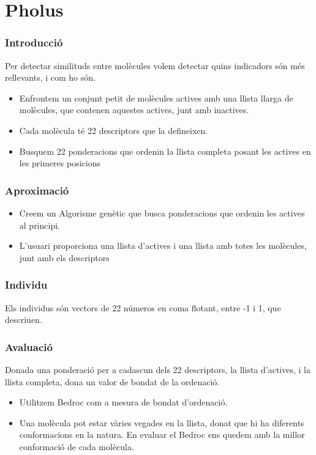 \documentclass{beamer}
\begin{document}
\section{Pholus} %
\label{sec:Pholus}

\begin{frame}
	\frametitle{Introducció}
	Per detectar similituds entre molècules volem detectar quins indicadors són
	més rellevants, i com ho són. 
	\pause
	\begin{itemize}
		\item Enfrontem un conjunt petit de molècules actives amb una llista llarga de molècules,
			que contenen aquestes actives, junt amb inactives.
		\item Cada molècula té 22 descriptors que la defineixen.
		\item Busquem 22 ponderacions que ordenin la llista completa posant les actives en les
			primeres posicions
	\end{itemize}
\end{frame}

\begin{frame}
\frametitle{Aproximació}
	\begin{itemize}
		\item Creem un Algorisme genètic que busca ponderacions que ordenin les actives al principi.
		\item L'usuari proporciona una llista d'actives i una llista amb totes les molècules, junt
			amb els descriptors
	\end{itemize}
\end{frame}


\begin{frame}
	\frametitle{Individu}
	Els individus són vectors de 22 números en coma flotant, entre -1 i 1, que descriuen.
\end{frame}

\begin{frame}
	\frametitle{Avaluació}
	\begin{block}{}
		Donada una ponderació per a cadascun dels 22 descriptors, la llista d'actives, i la llista
		completa, dona un valor de bondat de la ordenació.
	\end{block}
	\pause
	\begin{itemize}
		\item Utilitzem Bedroc com a mesura de bondat d'ordenació.
		\item Una molècula pot estar vàries vegades en la llista, donat que hi ha diferents
			conformacions en la natura.  En evaluar el Bedroc ens quedem amb la millor conformació
			de cada molècula.
	\end{itemize}
\end{frame}
\end{document}
